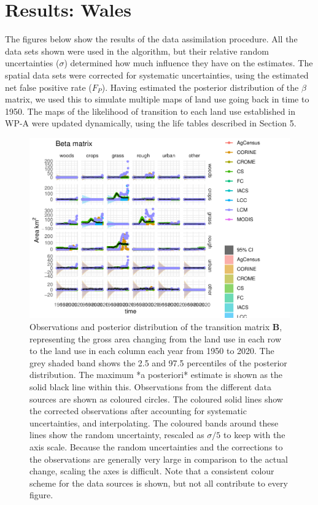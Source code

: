 \documentclass[
]{book}
\begin{document}
\hypertarget{results-wales}{%
\chapter{Results: Wales}\label{results-wales}}

The figures below show the results of the data assimilation procedure. All the data sets shown were used in the algorithm, but their relative random uncertainties (\(\sigma\)) determined how much influence they have on the estimates. The spatial data sets were corrected for systematic uncertainties, using the estimated net false positive rate (\(F_P\)). Having estimated the posterior distribution of the \(\beta\) matrix, we used this to simulate multiple maps of land use going back in time to 1950. The maps of the likelihood of transition to each land use established in WP-A were updated dynamically, using the life tables described in Section 5.

\begin{figure}
\includegraphics[width=1.3\linewidth]{Results_wa_files/figure-latex/plotB-1} \caption{ Observations and posterior distribution of the transition matrix $\mathbf{B}$, representing the gross area changing from the land use in each row to the land use in each column each year from 1950 to 2020. The grey shaded band shows the 2.5 and 97.5 percentiles of the posterior distribution. The maximum *a posteriori* estimate is shown as the solid black line within this. Observations from the different data sources are shown as coloured circles. The coloured solid lines show the corrected observations after accounting for systematic uncertainties, and interpolating. The coloured bands around these lines show the random uncertainty, rescaled as $\sigma /5$ to keep with the axis scale. Because the random uncertainties and the corrections to the observations are generally very large in comparison to the actual change, scaling the axes is difficult. Note that a consistent colour scheme for the data sources is shown, but not all contribute to every figure.}\label{fig:plotB}
\end{figure}
\end{document}
